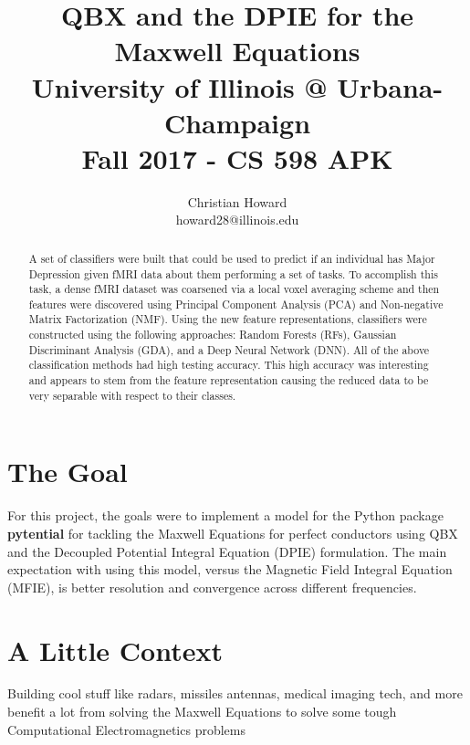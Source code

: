 \documentclass{article}[12pt]
\title{QBX and the DPIE for the Maxwell Equations \\  University of Illinois @ Urbana-Champaign\\ Fall 2017 - CS 598 APK}
\author{
	Christian Howard \\ howard28@illinois.edu
}
\date{} %
\begin{document}
	
	\maketitle
	\begin{abstract}
		A set of classifiers were built that could be used to predict if an individual has Major Depression given fMRI data about them performing a set of tasks. To accomplish this task, a dense fMRI dataset was coarsened via a local voxel averaging scheme and then features were discovered using Principal Component Analysis (PCA) and Non-negative Matrix Factorization (NMF). Using the new feature representations, classifiers were constructed using the following approaches: Random Forests (RFs), Gaussian Discriminant Analysis (GDA), and a Deep Neural Network (DNN). All of the above classification methods had high testing accuracy. This high accuracy was interesting and appears to stem from the feature representation causing the reduced data to be very separable with respect to their classes.
	\end{abstract}
	\newpage
	
	
	\section{The Goal}
	For this project, the goals were to implement a model for the Python package \textbf{pytential} for tackling the Maxwell Equations for perfect conductors using QBX and the Decoupled Potential Integral Equation (DPIE) formulation. The main expectation with using this model, versus the Magnetic Field Integral Equation (MFIE), is better resolution and convergence across different frequencies.
	
	

	
	
	\section{A Little Context}
	Building cool stuff like radars, missiles antennas, medical imaging tech, and more benefit a lot from solving the Maxwell Equations to solve some tough Computational Electromagnetics problems
	
\end{document}
